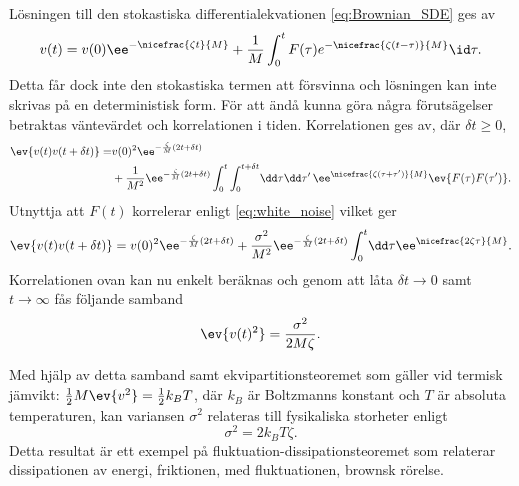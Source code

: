 Lösningen till den stokastiska differentialekvationen
\eqref{eq:Brownian_SDE} ges av  
\begin{equation}
v(t)
=v(0)\ee^{-\nicefrac{\zeta t}{M}}
 +\frac{1}{M}\int^t_0 F(\tau)e^{-\nicefrac{\zeta (t-\tau)}{M}} \id\tau.
\end{equation}
Detta får dock inte den stokastiska termen att försvinna och lösningen kan inte skrivas på en deterministisk form. För att ändå kunna göra några förutsägelser betraktas väntevärdet och korrelationen i tiden. Korrelationen ges av, där $\delta t\geq0$,
\begin{equation}\label{Brownian_korr}
\begin{aligned}
\ev{v(t)v(t+\delta t)} 
=& v(0)^2\ee^{-\frac{\zeta}{M}(2t+\delta t)}\\
 &+ \frac{1}{M^2}\ee^{-\frac{\zeta}{M} (2t+\delta t)}
  \int_0^t\int_0^{t+\delta t}\!\dd\tau\dd\tau'\, 
     \ee^{\nicefrac{\zeta (\tau+\tau')}{M}}\ev{F(\tau)F(\tau')}.
\end{aligned}
\end{equation}
Utnyttja att $F(t)$ korrelerar enligt \eqref{eq:white_noise} vilket ger 
\begin{equation} \label{eq:Brown_korr}
\ev{v(t)v(t+\delta t)} 
= v(0)^2\ee^{-\frac{\zeta}{M}(2t+\delta t)}
 +\frac{\sigma^2}{M^2}\ee^{-\frac{\zeta}{M} (2t+\delta t)}
  \int_0^t\!\dd\tau\ee^{\nicefrac{2\zeta \tau}{M}}.
\end{equation}
Korrelationen ovan kan nu enkelt beräknas och genom att låta $\delta t\to 0$ samt $t\to \infty$ fås följande samband
\begin{equation}
    \ev{v(t)^2} = \frac{\sigma^2}{2M\zeta}.
\end{equation}

Med hjälp av detta samband samt ekvipartitionsteoremet som gäller vid termisk jämvikt: $\frac{1}{2}M\ev{v^2}=\frac{1}{2}k_BT$, där $k_B$ är Boltzmanns konstant och $T$ är absoluta temperaturen, kan variansen $\sigma^2$ relateras till fysikaliska storheter enligt
\begin{equation}
    \sigma^2 = 2k_BT\zeta.
\end{equation}
Detta resultat är ett exempel på fluktuation-dissipationsteoremet som relaterar dissipationen av energi, friktionen, med fluktuationen, brownsk rörelse. 

